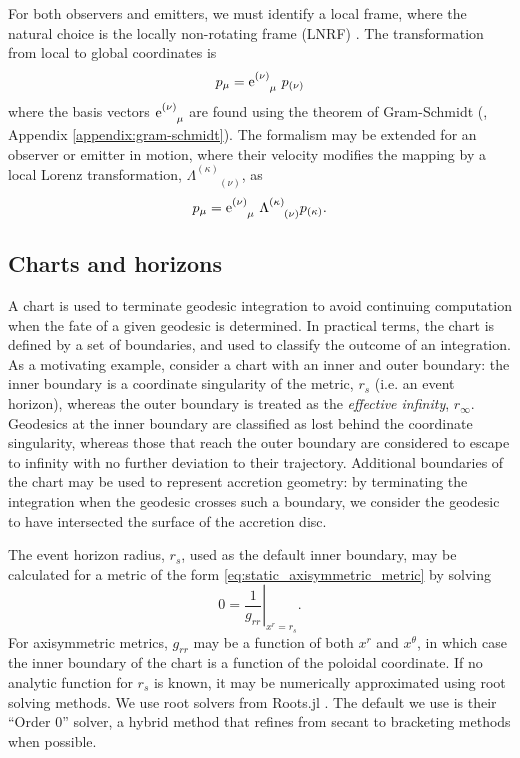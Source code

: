 For both observers and emitters, we must identify a local frame, where the natural choice is the locally non-rotating frame (LNRF) \citep{bardeen_rotating_1972} . The transformation from local to global coordinates is
\begin{equation}
    p_\mu = \text{e}^{(\nu)}_{\phantom{(\nu)}\mu}\  p_{(\nu)}
\end{equation}
where the basis vectors $\text{e}^{(\nu)}_{\phantom{(\nu)}\mu}$ are found using the theorem of Gram-Schmidt (\cite{}, Appendix \ref{appendix:gram-schmidt}). The formalism may be extended for an observer or emitter in motion, where their velocity modifies the mapping by a local Lorenz transformation, $\Lambda^{(\kappa)}_{\phantom{(\kappa)}(\nu)}$, as 
\begin{equation}
    p_\mu = \text{e}^{(\nu)}_{\phantom{(\nu)}\mu}\  \Lambda^{(\kappa)}_{\phantom{(a)}(\nu)} p_{(\kappa)}.
\end{equation}

\subsection{Charts and horizons}

A chart is used to terminate geodesic integration to avoid continuing computation when the fate of a given geodesic is determined. In practical terms, the chart is defined by a set of boundaries, and used to classify the outcome of an integration. As a motivating example, consider a chart with an inner and outer boundary: the inner boundary is a coordinate singularity of the metric, $r_s$ (i.e. an event horizon), whereas the outer boundary is treated as the \textit{effective infinity}, $r_\infty$. Geodesics at the inner boundary are classified as lost behind the coordinate singularity, whereas those that reach the outer boundary are considered to escape to infinity with no further deviation to their trajectory. Additional boundaries of the chart may be used to represent accretion geometry: by terminating the integration when the geodesic crosses such a boundary, we consider the geodesic to have intersected the surface of the accretion disc. 

The event horizon radius, $r_s$, used as the default inner boundary, may be calculated for a metric of the form \eqref{eq:static_axisymmetric_metric} by solving
\begin{equation}
    \label{eq:event_horizon}
    0 = \left. \frac{1}{g_{rr}} \right\rvert_{x^r = r_s}.
\end{equation}
For axisymmetric metrics, $g_{rr}$ may be a function of both $x^r$ and $x^\theta$, in which case the inner boundary of the chart is a function of the poloidal coordinate. If no analytic function for $r_s$ is known, it may be numerically approximated using root solving methods. We use root solvers from Roots.jl \citep{}. The default we use is their ``Order 0'' solver, a hybrid method that refines from secant to bracketing methods when possible.

